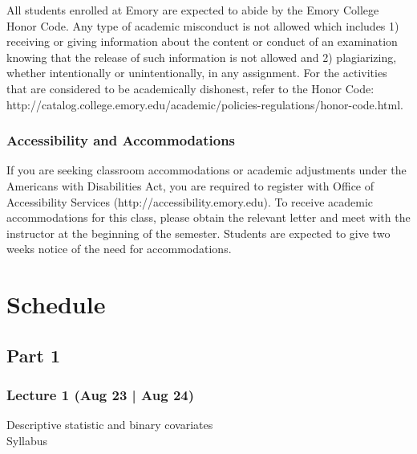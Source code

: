 \documentclass[12pt]{article}
\begin{document}
All students enrolled at Emory are expected to abide by the Emory College Honor Code. Any type of academic misconduct is not allowed which includes 1) receiving or giving information about the content or conduct of an examination knowing that the release of such information is not allowed and 2) plagiarizing, whether intentionally or unintentionally, in any assignment. For the activities that are considered to be academically dishonest, refer to the Honor Code: http://catalog.college.emory.edu/academic/policies-regulations/honor-code.html.\\

\subsubsection*{Accessibility and Accommodations}

If you are seeking classroom accommodations or academic adjustments under the Americans with Disabilities Act, you are required to register with Office of Accessibility Services (http://accessibility.emory.edu). To receive academic accommodations for this class, please obtain the relevant letter and meet with the instructor at the beginning of the semester. Students are expected to give two weeks notice of the need for accommodations.

\bigskip
			\newpage 
			\section*{Schedule}
\subsection*{Part 1}
\subsubsection*{Lecture 1 (Aug 23 | Aug 24)}
Descriptive statistic and binary covariates \\
Syllabus
\end{document}
